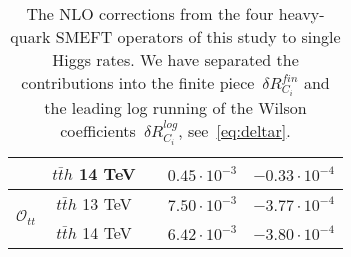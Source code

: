 \begin{table}[t!]
{\begin{tabular}{c||cccc}
			 &   $t\bar t h$  {\color{Mahogany}  14 TeV }& & $0.45\cdot 10^{-3}$& $-0.33\cdot 10^{-4}$\\        
			  \midrule	    	 
			 \multirow{2}{*}{{ \normalsize$\mathcal{O}_{tt}$}  }
			 &  $t\bar t h$ {\color{Mahogany}  13 TeV }& \mr{$m_t+\frac{m_h}{ 2}$}&  {$7.50\cdot 10^{-3}$} &$-3.77\cdot 10^{-4}$\\	    
			 &   $t\bar t h$  {\color{Mahogany}  14 TeV }& & $6.42\cdot 10^{-3}$& $-3.80\cdot 10^{-4}$\\                                           	
			\bottomrule
		\end{tabular}
	}
	\caption{The NLO corrections from the four heavy-quark SMEFT operators of this study to single Higgs rates. We have separated the contributions into the finite piece~$ \delta R_{C_i}^{fin}$ and the leading log running of the Wilson coefficients~$ \delta R_{C_i}^{log}$, see~\eqref{eq:deltar}. }
\label{table:res4top}
\end{table}


